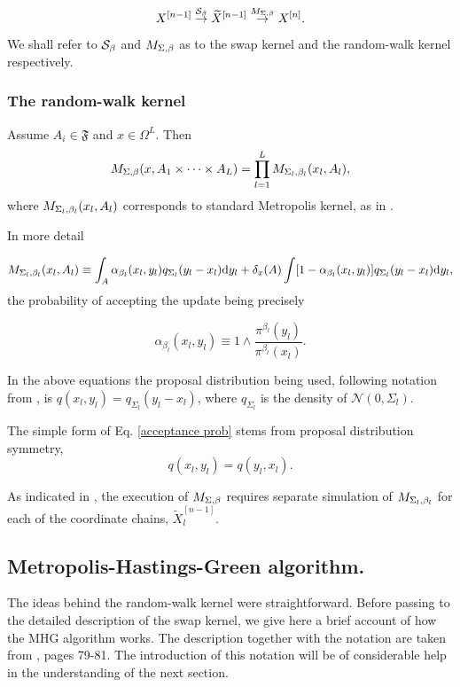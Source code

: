 $$X^{[n-1]} \overset{\mathcal{S}_{\beta}}{\rightarrow} \widetilde{X}^{[n-1]} \overset{M_{\Sigma,\beta}}{\rightarrow} X^{[n]}.$$

We shall refer to $\mathcal{S}_{\beta}$ and $M_{\Sigma,\beta}$ as to the swap kernel and the random-walk kernel respectively.



	\subsubsection*{The random-walk kernel}
	
Assume $A_i \in \mathfrak{F}$ and $x \in \Omega^L$. Then $$M_{\Sigma,\beta} (x, A_1 \times \dots \times A_L) = \prod_{l=1}^L M_{\Sigma_{l},\beta_{l}}(x_l, A_l),$$
where $M_{\Sigma_{l},\beta_{l}}(x_l, A_l)$ corresponds to standard Metropolis kernel, as in \citet*{CharlesJ.Geyer}. 

In more detail 

$$M_{\Sigma_{l},\beta_{l}}(x_l, A_l) \equiv \int_A \alpha_{\beta_l} (x_l, y_l) q_{\Sigma_l} (y_l - x_l) \mathrm{d }y_l + \delta_x (A) \int [1 - \alpha_{\beta_l} (x_l, y_l)] q_{\Sigma_l} (y_l - x_l) \mathrm{d }y_l ,$$
the probability of accepting the update being precisely 

\begin{equation}\label{acceptance prob}
	\alpha_{\beta_l} (x_l, y_l)  \equiv 1 \wedge \frac{\pi^{\beta_l}(y_l)}{\pi^{\beta_l}(x_l)}.
\end{equation}


In the above equations the proposal distribution being used, following notation from \cite{CharlesJ.Geyer}, is $q(x_l,y_l) = q_{\Sigma_l} (y_l - x_l)$, where $q_{\Sigma_l}$ is the density of $\mathcal{N}(0, \Sigma_l)$. 

The simple form of Eq. \ref{acceptance prob} stems from proposal distribution symmetry, $$q(x_l,y_l) = q(y_l,x_l).$$

As indicated in \cite{BłażejMiasojedow2}, the execution of $M_{\Sigma,\beta}$ requires separate simulation of $M_{\Sigma_{l},\beta_{l}}$ for each of the coordinate chains,  $\widetilde{X}^{[n-1]}_l$.


	\subsection*{Metropolis-Hastings-Green algorithm.}

The ideas behind the random-walk kernel were straightforward. Before passing to the detailed description of the swap kernel, we give here a brief account of how the MHG algorithm works. The description together with the notation are taken from \cite{CharlesJ.Geyer}, pages 79-81. The introduction of this notation will be of considerable help in the understanding of the next section. 


